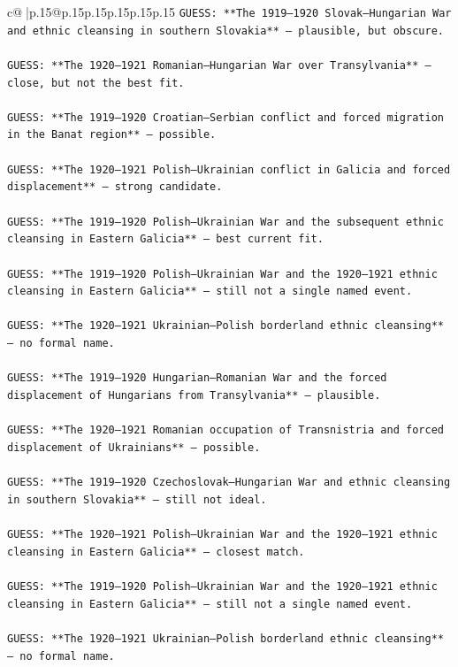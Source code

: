 \documentclass{article}
\begin{document}
{\begin{supertabular}{c@{$\;$}|p{.15\linewidth}@{}p{.15\linewidth}p{.15\linewidth}p{.15\linewidth}p{.15\linewidth}p{.15\linewidth}}
{{{\texttt{GUESS: **The 1919–1920 Slovak–Hungarian War and ethnic cleansing in southern Slovakia** — plausible, but obscure.} \\
\\ 
\texttt{GUESS: **The 1920–1921 Romanian–Hungarian War over Transylvania** — close, but not the best fit.} \\
\\ 
\texttt{GUESS: **The 1919–1920 Croatian–Serbian conflict and forced migration in the Banat region** — possible.} \\
\\ 
\texttt{GUESS: **The 1920–1921 Polish–Ukrainian conflict in Galicia and forced displacement** — strong candidate.} \\
\\ 
\texttt{GUESS: **The 1919–1920 Polish–Ukrainian War and the subsequent ethnic cleansing in Eastern Galicia** — best current fit.} \\
\\ 
\texttt{GUESS: **The 1919–1920 Polish–Ukrainian War and the 1920–1921 ethnic cleansing in Eastern Galicia** — still not a single named event.} \\
\\ 
\texttt{GUESS: **The 1920–1921 Ukrainian–Polish borderland ethnic cleansing** — no formal name.} \\
\\ 
\texttt{GUESS: **The 1919–1920 Hungarian–Romanian War and the forced displacement of Hungarians from Transylvania** — plausible.} \\
\\ 
\texttt{GUESS: **The 1920–1921 Romanian occupation of Transnistria and forced displacement of Ukrainians** — possible.} \\
\\ 
\texttt{GUESS: **The 1919–1920 Czechoslovak–Hungarian War and ethnic cleansing in southern Slovakia** — still not ideal.} \\
\\ 
\texttt{GUESS: **The 1920–1921 Polish–Ukrainian War and the 1920–1921 ethnic cleansing in Eastern Galicia** — closest match.} \\
\\ 
\texttt{GUESS: **The 1919–1920 Polish–Ukrainian War and the 1920–1921 ethnic cleansing in Eastern Galicia** — still not a single named event.} \\
\\ 
\texttt{GUESS: **The 1920–1921 Ukrainian–Polish borderland ethnic cleansing** — no formal name.} \\
}}}
\end{supertabular}}
\end{document}
